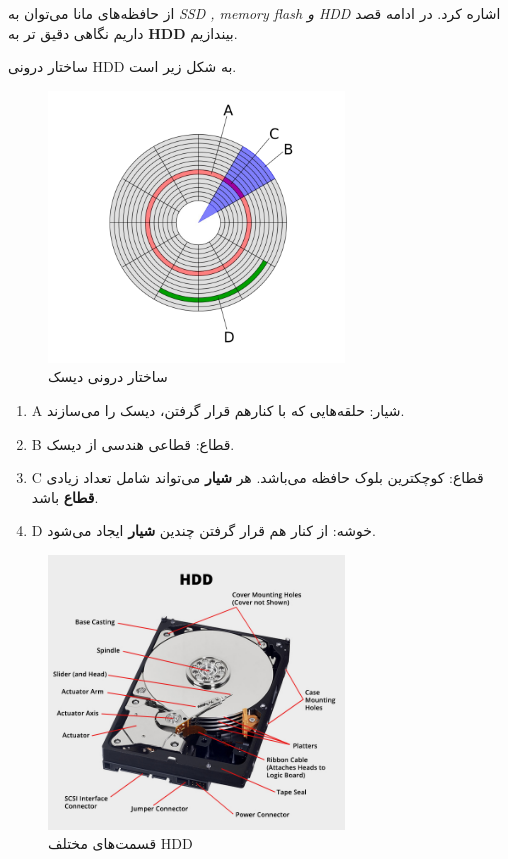 \begin{flushright}
    از حافظه‌های مانا می‌توان به \emph{SSD , memory flash و HDD } اشاره کرد.
    در ادامه قصد داریم نگاهی دقیق تر به \textbf{HDD} بیندازیم.

    ساختار درونی HDD به شکل زیر است.
    \begin{figure}[H]
        \centering
        \includegraphics[width=0.7\textwidth]{source/HDD}
        \caption{ساختار درونی دیسک}
        \label{fig:HDD}
    \end{figure}

    \begin{small}
        \begin{enumerate}
            \item[] A شیار: حلقه‌هایی که با کنارهم قرار گرفتن، دیسک را می‌سازند.
            \item[] B قطاع: قطاعی هندسی از دیسک.
            \item[] C قطاع: کوچکترین بلوک حافظه می‌باشد.
            هر \textbf{شیار} می‌تواند شامل تعداد زیادی \textbf{قطاع} باشد.
            \item[] D خوشه: از کنار هم قرار گرفتن چندین \textbf{شیار} ایجاد می‌شود.
        \end{enumerate}
    \end{small}

    \begin{figure}[H]
        \centering
        \includegraphics[width=0.7\textwidth]{source/hdd-structure}
        \caption{قسمت‌های مختلف HDD}
        \label{fig:hdd-structure}
    \end{figure}


\end{flushright}
